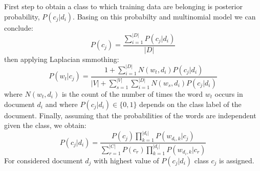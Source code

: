 First step to obtain a class to which training data are belonging is posterior probability, $P(c_j |d_i )$. Basing on this probabilty and multinomial model we can conclude:
\begin{equation}
P(c_j) = \frac{\sum_{i=1}^{|D|}P(c_j |d_i )}{|D|}
\end{equation}
\newline then applying Laplacian smmothing:
\begin{equation}
P(w_t|c_j)=\frac{1+\sum_{i=1}^{|D|}N(w_t,d_i)P(c_j|d_i)}{|V|+\sum_{s=1}^{|V|} \sum_{i=1}^{|D|}N(w_s,d_i)P(c_j|d_i)}
\end{equation}
\newline 
where $N(w_t,d_i)$ is the count of the number of times the word $w_t$ occurs in document
$d_i$ and where $P(c_j|d_i) \in \{0,1\} $ depends on the class label of the document.
Finally, assuming that the probabilities of the words are independent given the
class, we obtain:
\begin{equation}
P(c_j|d_i)=\frac{P(c_j)\prod_{k=1}^{|d_i|}P(w_{d_i,k}| c_j)}{\sum_{r=1}^{|C|}P(c_r)\prod_{k=1}^{|d_i|}P(w_{d_i,k}|c_r)}
\end{equation}
\newline For considered document $d_j$ with highest value of $P(c_j|d_i)$ class $c_j$ is assigned.




